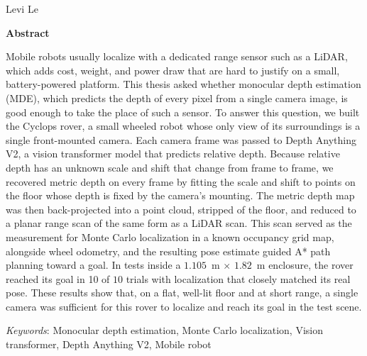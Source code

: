 
\clearpage
\thispagestyle{empty}
\begin{center}
  \vspace*{0.5in}
  {\Large\bfseries\coverTitle\par}
  \vspace{0.25in}
  {\large Levi Le\par}
  \vspace{0.4in}
  {\bfseries Abstract\par}
\end{center}

\vspace{0.1in}
\noindent
Mobile robots usually localize with a dedicated range sensor such as a LiDAR, which adds cost,
weight, and power draw that are hard to justify on a small, battery-powered platform. This thesis
asked whether monocular depth estimation (MDE), which predicts the depth of every pixel from a
single camera image, is good enough to take the place of such a sensor. To answer this question,
we built the Cyclops rover, a small wheeled robot whose only view of its surroundings is a single
front-mounted camera. Each camera frame was passed to Depth Anything V2, a vision transformer
model that predicts relative depth. Because relative depth has an unknown scale and shift that
change from frame to frame, we recovered metric depth on every frame by fitting the scale and
shift to points on the floor whose depth is fixed by the camera's mounting. The metric depth map
was then back-projected into a point cloud, stripped of the floor, and reduced to a planar range
scan of the same form as a LiDAR scan. This scan served as the measurement for Monte Carlo
localization in a known occupancy grid map, alongside wheel odometry, and the resulting pose
estimate guided A* path planning toward a goal. In tests inside a $1.105$~m $\times$ $1.82$~m
enclosure, the rover reached its goal in 10 of $10$ trials
with localization that closely matched its real pose. These results show
that, on a flat, well-lit floor and at short range, a single camera was sufficient for this rover to
localize and reach its goal in the test scene.

\vspace{0.2in}
\noindent
\textit{Keywords}: Monocular depth estimation, Monte Carlo localization, Vision transformer,
Depth Anything V2, Mobile robot

\clearpage

